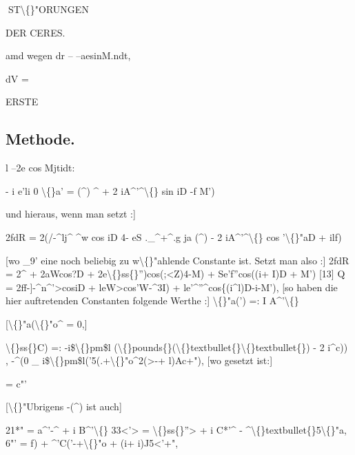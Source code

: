 \documentclass[10pt,a4paper]{article}
\begin{document}
\newpage
ST\textbackslash\{\}"ORUNGEN

DER CERES.

amd wegen dr -- --aesinM.ndt,

dV =

ERSTE

\subsection*{Methode.}


l --2e cos Mjtidt:

- i e'li 0 \textbackslash\{\}a'
= (\textasciicircum{})
\textasciicircum{} + 2 iA\textasciicircum{}'\textasciicircum{}\textbackslash\{\} sin iD -f M')

und hieraus, wenn man
setzt :]

2fdR = 2(/-\textasciicircum{}lj\textasciicircum{} \textasciicircum{}w cos iD 4- eS .\_\textasciicircum{}+\textasciicircum{}.g ja (\textasciicircum{}) - 2 iA\textasciicircum{}'\textasciicircum{}\textbackslash\{\} cos '\textbackslash\{\}"aD + ilf)

[wo \_9' eine noch beliebig zu w\textbackslash\{\}"ahlende Constante ist.
Setzt man also :]
2fdR = 2\textasciicircum{} + 2aWcos?D + 2e\textbackslash\{\}ss\{\}'')cos(;<Z)4-M) + Se'f''cos((i+ I)D + M')
[13]
Q = 2ff-]-\textasciicircum{}n\textasciicircum{}'>cosiD + leW>cos'W-\textasciicircum{}3I) + le'\textasciicircum{}''\textasciicircum{}cos\{(i\textasciicircum{}l)D-i-M'),
[so haben die hier auftretenden Constanten folgende Werthe :]
\textbackslash\{\}"a(') =: I A\textasciicircum{}'\textbackslash\{\}

[\textbackslash\{\}"a(\textbackslash\{\}"o\textasciicircum{} = 0,]

\textbackslash\{\}ss\{\}C) =: -i\$\textbackslash\{\}pm\$l (\textbackslash\{\}pounds\{\}(\textbackslash\{\}textbullet\{\}\textbackslash\{\}textbullet\{\}) - 2 i\textasciicircum{}c)) ,
-\textasciicircum{}(0 \_ i\$\textbackslash\{\}pm\$l('5(.+\textbackslash\{\}"o\textasciicircum{}2(>-+ l)Ac+"),
[wo gesetzt ist:]

= c"'

[\textbackslash\{\}"Ubrigens -(\textasciicircum{})
ist auch]

21*" = a\textasciicircum{}'-\textasciicircum{} + i B\textasciicircum{}'\textbackslash\{\}
33<'> = \textbackslash\{\}ss\{\}''> + i C*'\textasciicircum{} - \textasciicircum{}\textbackslash\{\}textbullet\{\}5\textbackslash\{\}"a,
6"' = f) + \textasciicircum{}'C('-+\textbackslash\{\}"o + (i+ i)J5<'+",
\end{document}
